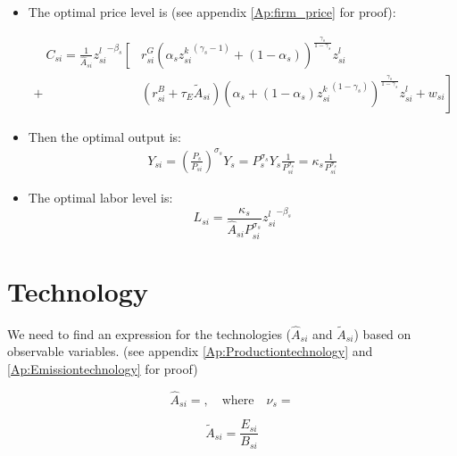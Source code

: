 \documentclass[12pt]{article} %
\begin{document}
\begin{itemize}
    \item The optimal price level is (see appendix \ref{Ap:firm_price} for proof):
    
    \begin{equation*}
         \begin{split}
            \quad C_{si}  =  \frac{1}{\hat{A}_{si}} {z_{si}^l}^{-\beta_s}  \left[\right. &
         r^{G}_{si}(\alpha_s {z_{si}^k}^{(\gamma_s-1)} + (1-\alpha_s))
			^{\frac{\gamma_s}{1-\gamma_s}} {z_{si}^l} \\
            +&(r^{B}_{si} + \tau_{E}\tilde{A}_{si})(
				\alpha_s  + (1-\alpha_s){z^k_{si}}^{(1-\gamma_s )}
			)^{\frac{\gamma_s}{1-\gamma_s}} {z_{si}^l}+ w_{si} \left.\right]
         \end{split}
	\end{equation*}
    \item Then the optimal output is:
    \begin{equation}
        \begin{split}
            Y_{si} = \left(\frac{P_s}{P_{si}}\right)^{\sigma_s}{Y}_s = P_s^{\sigma_s} {Y}_s \frac{1}{P_{si} ^{\sigma_s}}  = \kappa_s \frac{1}{P_{si} ^{\sigma_s}}
        \end{split}
    \end{equation}
    \item The optimal labor level is:
    \begin{equation}
        L_{si} = \frac{\kappa_s}{\hat{A}_{si}P_{si} ^{\sigma_s}}  {z_{si}^l}^{-\beta_s}
    \end{equation}
\end{itemize}

\section*{Technology}
We need to find an expression for the technologies ($\hat{A}_{si}$ and $\tilde{A}_{si}$) based on observable variables. (see appendix \ref{Ap:Productiontechnology} and \ref{Ap:Emissiontechnology} for proof)

\begin{equation*}
    \hat{A}_{si} = , \quad \text{where} \quad \nu_s = 
\end{equation*}

\begin{equation*}
    \tilde{A}_{si} = \frac{E_{si}}{B_{si}}
\end{equation*}
\end{document}

